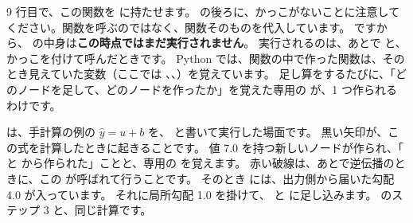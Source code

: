 9 行目で、この関数を  に持たせます。
 の後ろに、かっこがないことに注意してください。関数を呼ぶのではなく、関数そのものを代入しています。
ですから、 の中身は\textbf{この時点ではまだ実行されません}。
実行されるのは、あとで  と、かっこを付けて呼んだときです。
Python では、関数の中で作った関数は、そのとき見えていた変数（ここでは 、、）を覚えています。
足し算をするたびに、「どのノードを足して、どのノードを作ったか」を覚えた専用の  が、1 つ作られるわけです。

は、手計算の例の $\hat y=u+b$ を、 と書いて実行した場面です。
黒い矢印が、この式を計算したときに起きることです。
値 7.0 を持つ新しいノードが作られ、「 と  から作られた」ことと、専用の  を覚えます。
赤い破線は、あとで逆伝播のときに、この  が呼ばれて行うことです。
そのとき  には、出力側から届いた勾配 4.0 が入っています。
それに局所勾配 1.0 を掛けて、 と  に足し込みます。
のステップ 3 と、同じ計算です。

